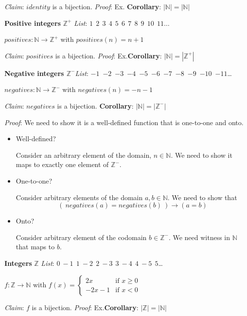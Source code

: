 \documentclass[12pt, oneside]{article}
\begin{document}
{\it Claim}: $identity$ is a bijection. {\it Proof}: Ex. \hfill {\bf Corollary}: $ | \mathbb{N} | = |\mathbb{N}|~$

{\bf Positive integers} $\mathbb{Z}^+$ \hfill {\it List}:  $1~~2~~3~~4~~5~~6~~7~~8~~9~~10~~11\ldots$

$positives: \mathbb{N} \to \mathbb{Z}^+$ with $positives(n) = n+1$

{\it Claim}: $positives$ is a bijection.  {\it Proof}: Ex.\hfill {\bf Corollary}: $ | \mathbb{N} | = |\mathbb{Z}^+|$

{\bf Negative integers $\mathbb{Z}^-$}\hfill  {\it List}: $-1$~$-2$~$-3$~$-4$~$-5$~$-6$~$-7$~$-8$~$-9$~$-10$~$-11$\ldots

$negatives: \mathbb{N} \to \mathbb{Z}^-$ with $negatives(n) = -n-1$

{\it Claim}: $negatives$ is a bijection. \hfill {\bf Corollary}: $ | \mathbb{N} | = |\mathbb{Z}^-|$

{\it Proof}: We need to show it is a well-defined function that is one-to-one and onto.

\begin{itemize}
\item Well-defined? 

Consider an arbitrary element of the domain, $n \in \mathbb{N}$. We need to show it maps to exactly one element of $\mathbb{Z}^-$.

\vfill

\item One-to-one?


Consider arbitrary elements of the domain $a, b \in \mathbb{N}$. We need to show that 
$$\left(~negatives(a) = negatives(b) ~\right) \to (a=b)$$

\vfill

\item Onto?

Consider arbitrary element of the codomain $b \in \mathbb{Z}^-$. We need witness in $\mathbb{N}$ that maps to $b$.

\vfill
\end{itemize}

{\bf Integers} $\mathbb{Z}$ \hfill {\it List}:  $0~-1~~1~-2~~2~-3~~3~-4~~4~-5~~5$\ldots

$f: \mathbb{Z} \to \mathbb{N}$ with $f(x) = \begin{cases}2x &\text{if $x \geq 0$} \\-2x-1 &\text{if $x < 0$} \end{cases}$

{\it Claim}: $f$ is a bijection.  {\it Proof}: Ex.\hfill {\bf Corollary}: $ | \mathbb{Z} | = |\mathbb{N}|$
\newpage
\end{document}
